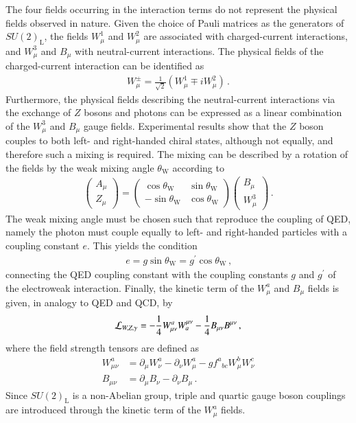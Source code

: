 The four fields occurring in the interaction terms do not represent the physical
fields observed in nature. Given the choice of Pauli matrices as the generators
of $SU(2)_{\text{L}}$, the fields $W_\mu^1$ and $W_\mu^2$ are associated with
charged-current interactions, and $W_\mu^3$ and $B_\mu$ with neutral-current
interactions. The physical fields of the charged-current interaction can be
identified as
\begin{align*}
  W_\mu^\pm = \frac{1}{\sqrt{2}} (W_\mu^1 \mp i W_\mu^2) \,\text{.}
\end{align*}
Furthermore, the physical fields describing the neutral-current interactions via
the exchange of $Z$ bosons and photons can be expressed as a linear combination
of the $W_\mu^3$ and $B_\mu$ gauge fields. Experimental results show that the
$Z$ boson couples to both left- and right-handed chiral states, although not
equally, and therefore such a mixing is required. The mixing can be described by
a rotation of the fields by the weak mixing angle $\theta_{\text{W}}$ according
to
\begin{align*}
  \begin{pmatrix}
    A_\mu \\
    Z_\mu
  \end{pmatrix}
  =
  \begin{pmatrix}
    \cos\theta_{\text{W}} & \sin\theta_{\text{W}} \\
    -\sin\theta_{\text{W}} & \cos\theta_{\text{W}}
  \end{pmatrix}
  \begin{pmatrix}
    B_\mu \\
    W_\mu^3
  \end{pmatrix} \,\text{.}
\end{align*}
The weak mixing angle must be chosen such that
 reproduce the
coupling of QED, namely the photon must couple equally to left- and right-handed
particles with a coupling constant $e$. This yields the condition
\begin{align*}
  e = g \sin\theta_{\text{W}} = g^\prime \cos\theta_{\text{W}} \,\text{,}
\end{align*}
connecting the QED coupling constant with the coupling constants $g$ and
$g^\prime$ of the electroweak interaction. Finally, the kinetic term of the
$W_\mu^a$ and $B_\mu$ fields is given, in analogy to QED and QCD, by
\begin{align*}
  \mathcal{L}_{W, Z, \gamma} =
  - \frac{1}{4} W_{\mu\nu}^a W^{\mu\nu}_a
  - \frac{1}{4} B_{\mu\nu} B^{\mu\nu} \,\text{,}
\end{align*}
where the field strength tensors are defined as
\begin{align*}
  W_{\mu\nu}^a &= \partial_\mu W_\nu^a - \partial_\nu W_\mu^a - g {f^a}_{bc} W_\mu^b W_\nu^c \\
  B_{\mu\nu} &= \partial_\mu B_\nu - \partial_\nu B_\mu \,\text{.}
\end{align*}
Since $SU(2)_{\text{L}}$ is a non-Abelian group, triple and quartic gauge boson
couplings are introduced through the kinetic term of the $W_\mu^a$ fields.


